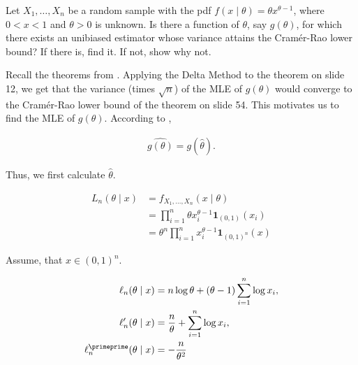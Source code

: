 
\begin{exercise}

Let $X_1, \dots, X_n$ be a random sample with the pdf $f(x \mid \theta) = \theta x^{\theta - 1}$, where $0 < x < 1$ and $\theta > 0$ is unknown.
Is there a function of $\theta$, say $g(\theta)$, for which there exists an unibiased estimator whose variance attains the Cramér-Rao lower bound?
If there is, find it.
If not, show why not.

\end{exercise}


\begin{solution}

Recall the theorems from \cite[lecture 7, slides 12, 54]{EStat}.
Applying the Delta Method to the theorem on slide 12, we get that the variance (times $\sqrt n$) of the MLE of $g(\theta)$ would converge to the Cramér-Rao lower bound of the theorem on slide 54.
This motivates us to find the MLE of $g(\theta)$.
According to \cite[lecture 7, slide 46]{EStat},

\begin{align*}
    \widehat{g(\theta)} = g(\hat \theta).
\end{align*}

Thus, we first calculate $\hat \theta$.

\begin{align*}
    L_n(\theta \mid x)
    & =
    f_{X_1, \dots, X_n}(x \mid \theta) \\
    & =
    \prod_{i=1}^n
        \theta x_i^{\theta - 1} \mathbf 1_{(0, 1)}(x_i) \\
    & =
    \theta^n
    \prod_{i=1}^n
        x_i^{\theta - 1}
    \mathbf 1_{(0, 1)^n}(x)
\end{align*}

Assume, that $x \in (0, 1)^n$.

\begin{align*}
    \ell_n(\theta \mid x)
    & =
    n \log \theta + (\theta - 1) \sum_{i=1}^n \log x_i, \\
    \ell_n^\prime(\theta \mid x)
    & =
    \frac{n}{\theta} + \sum_{i=1}^n \log x_i, \\
    \ell_n^\primeprime(\theta \mid x)
    & =
    -\frac{n}{\theta^2}
\end{align*}


\end{solution}
